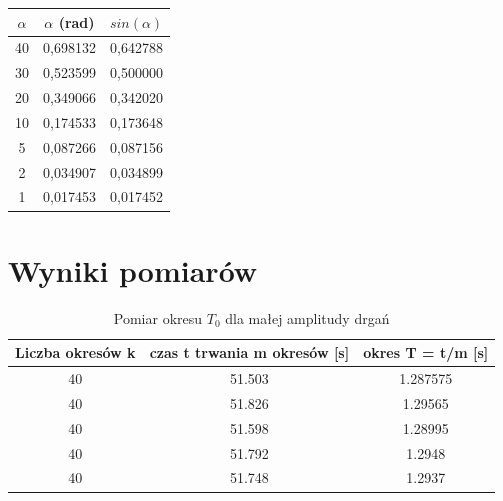 \documentclass[a4paper,12pt]{article}
\begin{document}
\begin{justify}
\begin{table}[H]
\begin{center}
\begin{scriptsize}
\begin{tabular}{|c|c|c|}
\hline
$\alpha$ & $\alpha$ (rad) & $sin(\alpha)$ \\
\hline
40   &  0,698132 & 0,642788 \\
30   & 0,523599 & 0,500000 \\
20   & 0,349066 & 0,342020 \\
10   & 0,174533 & 0,173648 \\
5    & 0,087266 & 0,087156 \\
2    & 0,034907 & 0,034899 \\
1    & 0,017453 & 0,017452 \\
\hline
\end{tabular}
\end{scriptsize}
\end{center}
\end{table}

\section{Wyniki pomiarów}

\begin{table}[H]
\begin{center}
\begin{scriptsize}
\begin{tabular}{|c|c|c|}
\hline
Liczba okresów k & czas t trwania m okresów [s] & okres T = t/m [s] \\
\hline
40 & 51.503 & 1.287575 \\
40 & 51.826 & 1.29565 \\
40 & 51.598 & 1.28995 \\
40 & 51.792 & 1.2948 \\
40 & 51.748 & 1.2937 \\
\hline
\end{tabular}
\caption{Pomiar okresu $T_{0}$ dla małej amplitudy drgań}
\end{scriptsize}
\end{center}
\end{table}


\end{justify}
\end{document}
